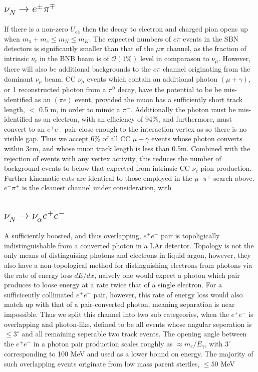 \documentclass[11pt, a4paper]{article}
\begin{document}
\subsection{$\nu_N \rightarrow e^\pm \pi^\mp$ }
If there is a non-zero $U_{e4}$ then the decay to electron and charged pion opens up when $m_\pi +m_e \leq m_N \leq m_K$. The expected numbers of $e \pi$ events in the SBN detectors is significantly smaller than that of the $\mu \pi$ channel, as the fraction of intrinsic $\nu_e$ in the BNB beam is of
$\mathcal{O}(1\%)$ level in comparason to $\nu_\mu$. However, there will also be additional backgrounds to the
$e \pi$ channel originating from the dominant $\nu_\mu$ beam. CC $\nu_\mu$ events which contain an additional photon $(\mu+\gamma)$, or 1 reconstructed photon from a $\pi^0$ decay, have the potential to be be mis-identified as an $(\pi
e)$ event, provided the muon has a sufficiently short track length, $<$ 0.5 m, in order to mimic a $\pi^-$. Additionally the photon must be mis-identified as an electron, with an efficiency of 94\%, and furthermore, must convert to an $e^+e^-$ pair close enough to the interaction vertex as so there is no visible gap. Thus we accept 6\% of all CC $\mu+\gamma$ events whose photon converts within 3cm, and whose muon track length is less than 0.5m. Combined with the rejection of events with any vertex activity, this reduces the number of background events to below that expected from intrinsic CC $\nu_e$ pion production. Further kinematic cuts are identical to those employed in the $\mu^- \pi^+$ search above. $e^- \pi^+$ is the cleanest channel under consideration, with  


\subsection{$\nu_N \rightarrow \nu_\alpha e^+ e^-$ }

A sufficiently boosted, and thus overlapping, $e^+e^-$ pair is topoligically indistinguishable from a converted photon in a LAr detector. Topology is not the only means of distinguising photons and electrons in liquid argon, however, they also have a non-topological method for distinguishing electrons from photons via the rate of energy loss $dE/dx$, naively one would expect a photon which pair produces to loose energy at a rate twice that of a single electron. For a sufficicently collimated $e^+e^-$ pair, however, this rate of energy loss would also match up with that of a pair-converted photon, meaning separation is near impossible. Thus we split this channel into two sub categeories, when the $e^+e^-$ is overlapping and photon-like, defined to be all events whose angular seperation is $\leq 3^\circ$\cite{Spitz:2011wba} and all remaining seperable two track events. The opening angle between the $e^+e^-$ in a photon pair production scales roughly as $\approx m_e/E_\gamma$, with $3^\circ$ corresponding to 100 MeV and used as a lower bound on energy. The majority of such overlapping events originate from low mass parent steriles, $\leq 50$ MeV\\ 
\end{document}
